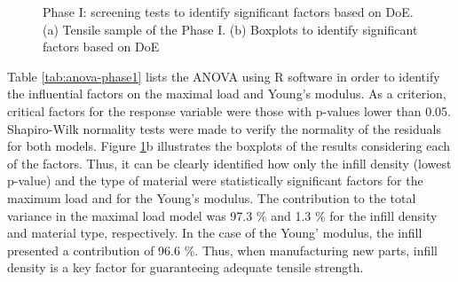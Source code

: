 \documentclass[
  12pt]{article}
\begin{document}
\begin{figure}

{\centering {}\newline{}

}

\caption{Phase I: screening tests to identify significant factors based on DoE. (a) Tensile sample of the Phase I. (b) Boxplots to identify significant factors based on DoE}\label{fig:fase1}
\end{figure}

Table \ref{tab:anova-phase1} lists the ANOVA using R software in order to identify the influential factors on the maximal load and Young's modulus.
As a criterion, critical factors for the response variable were those with p-values lower than 0.05.
Shapiro-Wilk normality tests were made to verify the normality of the residuals for both models.
Figure \ref{fig:fase1}b illustrates the boxplots of the results considering each of the factors.
Thus, it can be clearly identified how only the infill density (lowest p-value) and the type of material were statistically significant factors for the maximum load and for the Young's modulus.
The contribution to the total variance in the maximal load model was 97.3 \% and 1.3 \% for the infill density and material type, respectively.
In the case of the Young' modulus, the infill presented a contribution of 96.6 \%.
Thus, when manufacturing new parts, infill density is a key factor for guaranteeing adequate tensile strength.
\end{document}
